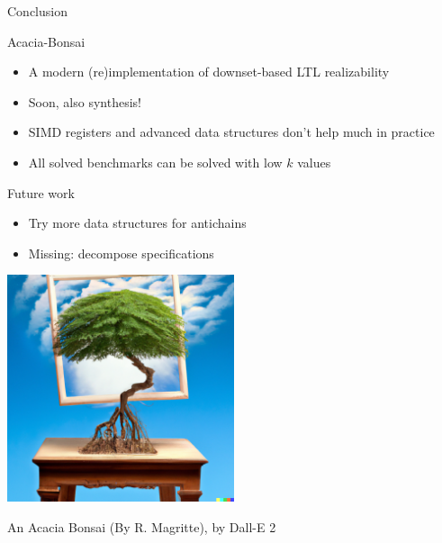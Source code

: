 \documentclass[aspectratio=169]{beamer}
\begin{document}
\begin{frame}{Conclusion}
  \begin{block}{Acacia-Bonsai}
    \begin{itemize}
      \item A modern (re)implementation of downset-based LTL realizability
      \item Soon, \alert{also synthesis!}
      \item SIMD registers and advanced data structures don't help much in
        practice
      \item All solved benchmarks can be solved with low $k$ values
    \end{itemize}
  \end{block}

  \pause

  \begin{block}{Future work}
    \begin{itemize}
      \item Try more data structures for antichains
      \item Missing: decompose specifications
    \end{itemize}
  \end{block}
\end{frame}

\begin{frame}
  \centering
  \includegraphics[width=0.5\textwidth]{abonsai-magritte}

  An Acacia Bonsai (By R. Magritte), by Dall-E 2
\end{frame}
\end{document}
